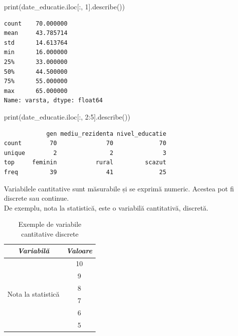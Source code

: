 \documentclass[
  11pt,
  b5paper,
  nottoc]{book}
\newenvironment{Shaded}{\begin{snugshade}}{\end{snugshade}}
\newcommand{\BuiltInTok}[1]{\textcolor[rgb]{0.00,0.23,0.31}{#1}}
\newcommand{\DecValTok}[1]{\textcolor[rgb]{0.68,0.00,0.00}{#1}}
\newcommand{\NormalTok}[1]{\textcolor[rgb]{0.00,0.23,0.31}{#1}}
\begin{document}
\begin{Shaded}
\begin{Highlighting}[]
\BuiltInTok{print}\NormalTok{(date\_educatie.iloc[:, }\DecValTok{1}\NormalTok{].describe())}
\end{Highlighting}
\end{Shaded}

\begin{verbatim}
count    70.000000
mean     43.785714
std      14.613764
min      16.000000
25%      33.000000
50%      44.500000
75%      55.000000
max      65.000000
Name: varsta, dtype: float64
\end{verbatim}

\begin{Shaded}
\begin{Highlighting}[]
\BuiltInTok{print}\NormalTok{(date\_educatie.iloc[:, }\DecValTok{2}\NormalTok{:}\DecValTok{5}\NormalTok{].describe())}
\end{Highlighting}
\end{Shaded}

\begin{verbatim}
            gen mediu_rezidenta nivel_educatie
count        70              70             70
unique        2               2              3
top     feminin           rural         scazut
freq         39              41             25
\end{verbatim}

Variabilele cantitative sunt măsurabile și se exprimă numeric. Acestea
pot fi discrete sau continue.\\
De exemplu, nota la statistică, este o variabilă cantitativă, discretă.

\begin{table}[!h]
\centering
\caption{Exemple de variabile cantitative discrete}
\label{my-label}
\begin{tabular}{@{}lc@{}}
\toprule
\multicolumn{1}{c}{\textit{Variabilă}} & \multicolumn{1}{c}{\textit{Valoare}} \\ \midrule
\multirow{6}{*}{Nota la statistică}    & 10                                   \\
                                       & 9                                    \\
                                       & 8                                    \\
                                       & 7                                    \\
                                       & 6                                    \\
                                       & 5                                    \\ \cmidrule(l){2-2} 
\end{tabular}
\end{table}
\end{document}

